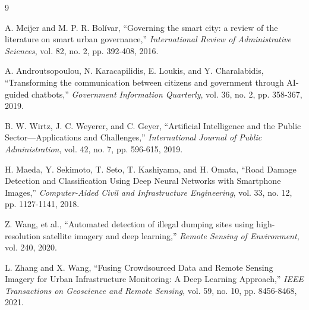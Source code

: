 \documentclass[12pt,a4paper]{article}
\begin{document}
\begin{thebibliography}{9}

A. Meijer and M. P. R. Bolívar, ``Governing the smart city: a review of the literature on smart urban governance,'' \textit{International Review of Administrative Sciences}, vol. 82, no. 2, pp. 392-408, 2016.

A. Androutsopoulou, N. Karacapilidis, E. Loukis, and Y. Charalabidis, ``Transforming the communication between citizens and government through AI-guided chatbots,'' \textit{Government Information Quarterly}, vol. 36, no. 2, pp. 358-367, 2019.

B. W. Wirtz, J. C. Weyerer, and C. Geyer, ``Artificial Intelligence and the Public Sector—Applications and Challenges,'' \textit{International Journal of Public Administration}, vol. 42, no. 7, pp. 596-615, 2019.

H. Maeda, Y. Sekimoto, T. Seto, T. Kashiyama, and H. Omata, ``Road Damage Detection and Classification Using Deep Neural Networks with Smartphone Images,'' \textit{Computer-Aided Civil and Infrastructure Engineering}, vol. 33, no. 12, pp. 1127-1141, 2018.

Z. Wang, et al., ``Automated detection of illegal dumping sites using high-resolution satellite imagery and deep learning,'' \textit{Remote Sensing of Environment}, vol. 240, 2020.

L. Zhang and X. Wang, ``Fusing Crowdsourced Data and Remote Sensing Imagery for Urban Infrastructure Monitoring: A Deep Learning Approach,'' \textit{IEEE Transactions on Geoscience and Remote Sensing}, vol. 59, no. 10, pp. 8456-8468, 2021.

\end{thebibliography}
\end{document}
